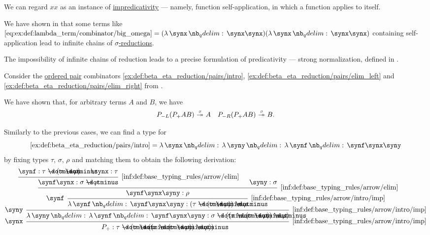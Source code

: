 \begin{example}
\begin{thmenum}
    We can regard \( xx \) as an instance of \hyperref[con:impredicativity]{impredicativity} --- namely, function self-application, in which a function applies to itself.

    We have shown in  that some terms like \( \ref{eq:ex:def:lambda_term/combinator/big_omega} = (\qabs \synx \synx \synx) (\qabs \synx \synx \synx) \) containing self-application lead to infinite chains of \hyperref[def:beta_eta_reduction]{\( \sigma \)-reductions}.

    The impossibility of infinite chains of reduction leads to a precise formulation of predicativity --- strong normalization, defined in .

     Consider the \hyperref[def:ordered_tuple]{ordered pair} combinators \ref{ex:def:beta_eta_reduction/pairs/intro}, \ref{ex:def:beta_eta_reduction/pairs/elim_left} and \ref{ex:def:beta_eta_reduction/pairs/elim_right} from .

    We have shown that, for arbitrary terms \( A \) and \( B \), we have
    \begin{align*}
      P_{-L} (P_+ A B) \bred* A
      &&
      P_{-R} (P_+ A B) \bred* B.
    \end{align*}

    Similarly to the previous cases, we can find a type for
    \begin{equation*}
      \ref{ex:def:beta_eta_reduction/pairs/intro} = \qabs \synx \qabs \syny \qabs \synf \synf \synx \syny
    \end{equation*}
    by fixing types \( \tau \), \( \sigma \), \( \rho \) and matching them to obtain the following derivation:
    \begin{equation*}
      \begin{prooftree}
        \hypo{ \synf: \tau \synimplies (\sigma \synimplies \rho) }
        \hypo{ \synx: \tau }
        \infer2[\ref{inf:def:base_typing_rules/arrow/elim}]{ \synf \synx: \sigma \synimplies \rho }

        \hypo{ \syny: \sigma }
        \infer2[\ref{inf:def:base_typing_rules/arrow/elim}]{ \synf \synx \syny: \rho }
        \infer[left label=\( \synf \)]1[\ref{inf:def:base_typing_rules/arrow/intro/imp}]{ \qabs \synf \synf \synx \syny: (\tau \synimplies (\sigma \synimplies \rho)) \synimplies \rho }
        \infer[left label=\( \syny \)]1[\ref{inf:def:base_typing_rules/arrow/intro/imp}]{ \qabs \syny \qabs \synf \synf \synx \syny: \sigma \synimplies ((\tau \synimplies (\sigma \synimplies \rho)) \synimplies \rho) }
        \infer[left label=\( \synx \)]1[\ref{inf:def:base_typing_rules/arrow/intro/imp}]{ P_+: \tau \synimplies (\sigma \synimplies ((\tau \synimplies (\sigma \synimplies \rho)) \synimplies \rho)) }
      \end{prooftree}
    \end{equation*}


\end{thmenum}
\end{example}
